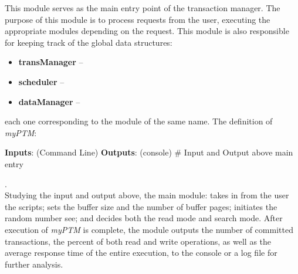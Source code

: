 This module serves as the main entry point of the transaction manager. The purpose of this module is to process requests from the user, executing the appropriate modules depending on the request. This module is also responsible for keeping track of the global data structures:

\begin{itemize}
 \item \textbf{transManager} --
 \item \textbf{scheduler} -- 
 \item  \textbf{dataManager} --
 \end{itemize}

each one corresponding to the module of the same name. The definition of \textit{myPTM}:

\begin{algorithmic}[1]

    \State \textbf{Inputs}: (Command Line)
    \State {}
    \State {}
     \State {}
     \State {}
     \State {}
      \State {}
      \State {}
      \State \textbf{Outputs}: (console)
       \State {}
        \State {}
         \State {}
    	 \State {}
	\State \# Input and Output above
	 {} 
	\State main entry
	\EndFunction  
\end{algorithmic}  . \\

Studying the input and output above, the main module: takes in from the user the scripts; sets the buffer size and the number of buffer pages; initiates the random number see; and decides both the read mode and search mode. After execution of \textit{myPTM} is complete, the module outputs the number of committed transactions, the percent of both read and write operations, as well as the average response time of the entire execution, to the console or a log file for further analysis.